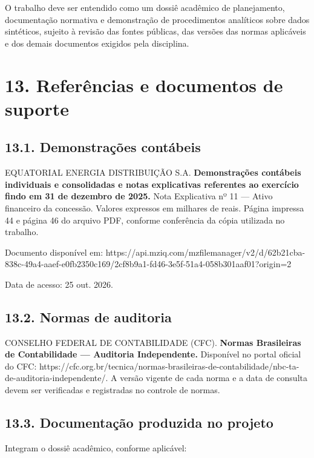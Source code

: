 \documentclass[
]{article}
\begin{document}
O trabalho deve ser entendido como um dossiê acadêmico de planejamento,
documentação normativa e demonstração de procedimentos analíticos sobre
dados sintéticos, sujeito à revisão das fontes públicas, das versões das
normas aplicáveis e dos demais documentos exigidos pela disciplina.

\section{13. Referências e documentos de
suporte}\label{referuxeancias-e-documentos-de-suporte}

\subsection{13.1. Demonstrações
contábeis}\label{demonstrauxe7uxf5es-contuxe1beis}

EQUATORIAL ENERGIA DISTRIBUIÇÃO S.A. \textbf{Demonstrações contábeis
individuais e consolidadas e notas explicativas referentes ao exercício
findo em 31 de dezembro de 2025.} Nota Explicativa nº 11 --- Ativo
financeiro da concessão. Valores expressos em milhares de reais. Página
impressa 44 e página 46 do arquivo PDF, conforme conferência da cópia
utilizada no trabalho.

Documento disponível em:
https://api.mziq.com/mzfilemanager/v2/d/62b21cba-838c-49a4-aaef-e0fb2350c169/2cf8b9a1-fd46-3e5f-51a4-058b301aaf01?origin=2

Data de acesso: 25 out. 2026.

\subsection{13.2. Normas de auditoria}\label{normas-de-auditoria}

CONSELHO FEDERAL DE CONTABILIDADE (CFC). \textbf{Normas Brasileiras de
Contabilidade --- Auditoria Independente.} Disponível no portal oficial
do CFC:
https://cfc.org.br/tecnica/normas-brasileiras-de-contabilidade/nbc-ta-de-auditoria-independente/.
A versão vigente de cada norma e a data de consulta devem ser
verificadas e registradas no controle de normas.

\subsection{13.3. Documentação produzida no
projeto}\label{documentauxe7uxe3o-produzida-no-projeto}

Integram o dossiê acadêmico, conforme aplicável:
\end{document}
